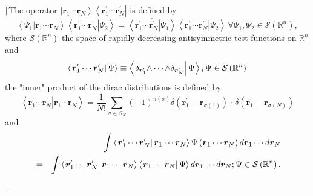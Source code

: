 \documentclass[12pt]{article}
\begin{document}
$\lceil $The operator $\left\vert \boldsymbol{r}_{1}\cdots \boldsymbol{r}%
_{N}\right\rangle \left\langle \boldsymbol{r}_{1}^{\prime }\cdots 
\boldsymbol{r}_{N}^{\prime }\right\vert $ is defined by 
\begin{equation}
\left\langle \left. \Psi _{1}\right\vert \boldsymbol{r}_{1}\cdots 
\boldsymbol{r}_{N}\right\rangle \left\langle \left. \boldsymbol{r}%
_{1}^{\prime }\cdots \boldsymbol{r}_{N}^{\prime }\right\vert \Psi
_{2}\right\rangle =\overline{\left\langle \left. \boldsymbol{r}_{1}^{\prime
}\cdots \boldsymbol{r}_{N}^{\prime }\right\vert \Psi _{1}\right\rangle }%
\left\langle \left. \boldsymbol{r}_{1}^{\prime }\cdots \boldsymbol{r}%
_{N}^{\prime }\right\vert \Psi _{2}\right\rangle \,\forall \Psi _{1},\Psi
_{2}\in \mathcal{S}\left( \mathbb{R}^{n}\right) ,
\end{equation}%
where $\mathcal{S}\left( \mathbb{R}^{n}\right) $ the space of rapidly
decreasing antisymmetric test functions on $\mathbb{R}^{n}$ and 
\begin{equation}
\left\langle \left. \boldsymbol{r}_{1}^{\prime }\cdots \boldsymbol{r}%
_{N}^{\prime }\right\vert \Psi \right\rangle \equiv \left\langle \left.
\delta _{\boldsymbol{r}_{1}^{\prime }}\mathbf{\wedge \cdots \wedge }\delta _{%
\boldsymbol{r}_{N}^{\prime }}\right\vert \Psi \right\rangle ,\Psi \in 
\mathcal{S}\left( \mathbb{R}^{n}\right) 
\end{equation}%
the "inner" product of the dirac distributions is defined by 
\begin{equation}
\left\langle \left. \boldsymbol{r}_{1}^{\prime }\cdots \boldsymbol{r}%
_{N}^{\prime }\right\vert \boldsymbol{r}_{1}\cdots \boldsymbol{r}%
_{N}\right\rangle =\frac{1}{N!}\sum_{\sigma \in S_{N}}\left( -1\right) ^{\pi
\left( \sigma \right) }\delta \left( \boldsymbol{r}_{1}^{\prime }-%
\boldsymbol{r}_{\sigma \left( 1\right) }\right) \cdots \delta \left( 
\boldsymbol{r}_{1}^{\prime }-\boldsymbol{r}_{\sigma \left( N\right) }\right) 
\end{equation}%
and 
\begin{eqnarray}
&&\int \left\langle \left. \boldsymbol{r}_{1}^{\prime }\cdots \boldsymbol{r}%
_{N}^{\prime }\right\vert \boldsymbol{r}_{1}\cdots \boldsymbol{r}%
_{N}\right\rangle \Psi \left( \boldsymbol{r}_{1}\cdots \boldsymbol{r}%
_{N}\right) d\boldsymbol{r}_{1}\cdots d\boldsymbol{r}_{N}  \notag \\
&=&\int \left\langle \left. \boldsymbol{r}_{1}^{\prime }\cdots \boldsymbol{r}%
_{N}^{\prime }\right\vert \boldsymbol{r}_{1}\cdots \boldsymbol{r}%
_{N}\right\rangle \left\langle \left. \boldsymbol{r}_{1}\cdots \boldsymbol{r}%
_{N}\right\vert \Psi \right\rangle d\boldsymbol{r}_{1}\cdots d\boldsymbol{r}%
_{N};\Psi \in \mathcal{S}\left( \mathbb{R}^{n}\right) .
\end{eqnarray}%
$\rfloor $
\end{document}
